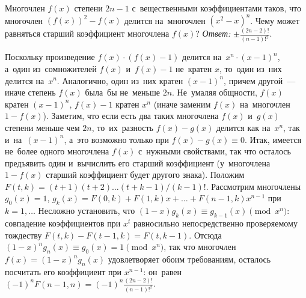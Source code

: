 \problem{}
Многочлен $f(x)$ степени $2 n - 1$ с~вещественными коэффициентами таков, что
многочлен $(f(x))^2 - f(x)$ делится на~многочлен $(x^2 - x)^n$.
Чему может равняться старший коэффициент многочлена $f(x)$?
\solution
\emph{Ответ:}\enspace
\(\displaystyle
    \pm \frac{(2n-2)!}{(n-1)!^2}
\)\;.
\par
Поскольку произведение $f(x) \cdot (f(x) - 1)$ делится
на~$x^n \cdot (x - 1)^n$, а~один из~сомножителей $f(x)$ и~$f(x) - 1$ не~кратен
$x$, то~один из~них делится на~$x^n$.
Аналогично, один из~них кратен $(x - 1)^n$, причем другой~--- иначе степень
$f(x)$ была~бы не~меньше $2 n$.
Не~умаляя общности, $f(x)$ кратен $(x - 1)^n$,
$f(x) - 1$ кратен $x^n$ (иначе заменим $f(x)$ на~многочлен $1 - f(x)$).
Заметим, что если есть два таких многочлена $f(x)$ и~$g(x)$ степени меньше чем
$2 n$, то~их~разность $f(x) - g(x)$ делится как на~$x^n$, так и~на~$(x - 1)^n$,
а~это возможно только при $f(x) - g(x) \equiv 0$.
Итак, имеется не~более одного многочлена $f(x)$ с~нужными свойствами, так что
осталось предъявить один и~вычислить его старший коэффициент
(у~многочлена $1 - f(x)$ старший коэффициент будет другого знака).
Положим $F(t, k) = (t + 1) (t + 2) \ldots (t + k - 1) / (k - 1)!$.
Рассмотрим многочлены
$g_0(x) = 1$, $g_k(x) = F(0, k) + F(1, k) x + \ldots + F(n - 1, k) x^{n-1}$
при $k = 1, \ldots$
Несложно установить, что $(1 - x) g_k(x) \equiv g_{k-1}(x) \pmod{x^n}$:
совпадение коэффициентов при $x^t$ равносильно непосредственно проверяемому
тождеству $F(t,k) - F(t -1, k) = F(t, k - 1)$.
Отсюда $(1 - x)^n g_n(x) \equiv g_0(x) = 1 \pmod{x^n}$,
так что многочлен $f(x) = (1 - x)^n g_n(x)$ удовлетворяет обоим требованиям,
осталось посчитать его коэффициент при $x^{n-1}$: он~равен
$(-1)^n F(n - 1, n) = (-1)^n \frac{(2 n - 2)!}{(n - 1)!^2}$.
\endproblem
